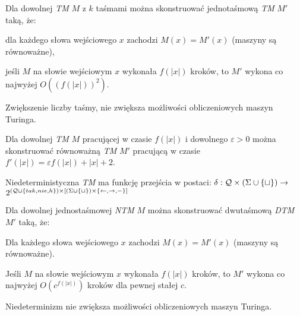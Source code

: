 \begin{twierdzenie}
    Dla dowolnej \textit{TM} $M$ z $k$ taśmami można skonstruować jednotaśmową \textit{TM} $M'$ taką, że:
    \begin{enumerate*}[label=\roman*)]
        \item dla każdego słowa wejściowego $x$ zachodzi $M(x) = M'(x)$ (maszyny są równoważne),
        \item jeśli $M$ na słowie wejściowym $x$ wykonała $f(|x|)$ kroków, to $M'$ wykona co najwyżej $O({(f(|x|))}^2)$.
    \end{enumerate*}
    Zwiększenie liczby taśmy, nie zwiększa możliwości obliczeniowych maszyn Turinga.
\end{twierdzenie}
\begin{twierdzenie}
    Dla dowolnej \textit{TM} $M$ pracującej w czasie $f(|x|)$ i dowolnego $\varepsilon > 0$
    można skonstruować równoważną \textit{TM} $M'$ pracującą w czasie $f'(|x|) = \varepsilon f(|x|) + |x| + 2$.
\end{twierdzenie}
\begin{definicja}
    Niedeterministyczna \textit{TM} ma funkcję przejścia w postaci:
    $\delta : \mathcal{Q} \times {(\Sigma \cup \{\sqcup\})} \rightarrow$ $2^{(\mathcal{Q} \cup \{tak, nie, h\}) \times {[(\Sigma \cup \{\sqcup\}) \times \{\leftarrow, \rightarrow, -\}]}}$
\end{definicja}
\begin{twierdzenie}
    Dla dowolnej jednostaśmowej \textit{NTM} $M$ można skonstruować dwutaśmową \textit{DTM} $M'$ taką, że:
    \begin{enumerate*}[label=\roman*)]
        \item Dla każdego słowa wejściowego $x$ zachodzi $M(x) = M'(x)$ (maszyny są równoważne).
        \item Jeśli $M$ na słowie wejściowym $x$ wykonała $f(|x|)$ kroków, to $M'$ wykona co najwyżej $O(c^{f(|x|)})$ kroków dla pewnej stałej $c$.
    \end{enumerate*}
    Niedeterminizm nie zwiększa możliwości obliczeniowych maszyn Turinga.
\end{twierdzenie}